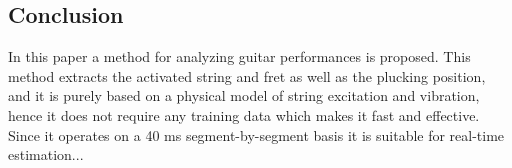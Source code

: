 \documentclass{article}
\begin{document}
\begin{sloppy}
\section{Conclusion}
In this paper a method for analyzing guitar performances is proposed. This method extracts the activated string and fret as well as the plucking position, and it is purely based on a physical model of string excitation and vibration, hence it does not require any training data which makes it fast and effective. Since it operates on a 40 ms segment-by-segment basis it is suitable for real-time estimation...
%

\pagebreak


%
% 
%
%
%
% 
%
% 
% 


\end{sloppy}
\end{document}
